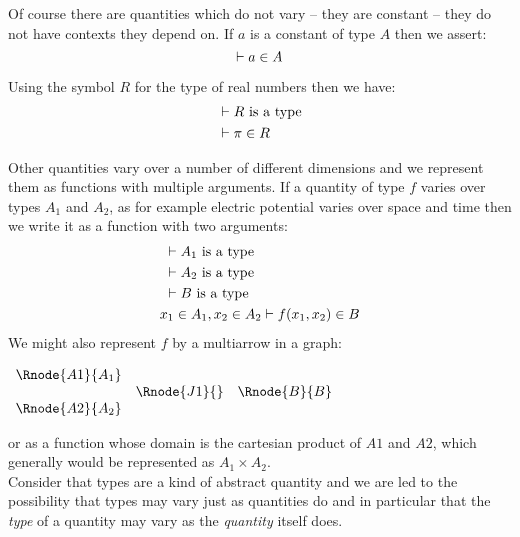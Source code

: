\documentclass[10pt,a4paper]{scrartcl}
\begin{document}
\noindent Of course there are quantities which do not vary  -- they are constant -- they do not have contexts they depend  on.  If $a$ is a constant of type $A$ then we assert: 
\begin{equation*}
\vdash a \in A
\end{equation*}

\noindent Using the symbol $R$ for the type of real numbers then we have:
\begin{align*}
&\vdash R\mbox{ is a type} \\
&\vdash \pi \in R
\end{align*}

\noindent Other quantities vary over a number of different dimensions and we represent them as functions
with multiple arguments. 
If a quantity of type $f$ varies over types $A_1$ and $A_2$, as for example electric potential varies over
space and time then we write it as a function with two arguments:
\begin{align*}
&\text{                                  }\vdash A_1\mbox{ is a type} \\
&\text{                                  }\vdash A_2\mbox{ is a type} \\
&\text{                                  }\vdash B\mbox{ is a type} \\
&x_1 \in A_1,x_2 \in A_2 \vdash f(x_1,x_2) \in B 
\end{align*}
\noindent
We might also represent $f$ by a multiarrow in a graph:
\setlength{\arraycolsep}{1cm}
\begin{center}
$
\begin{array}{cccc}
\Rnode{A1}{A_1}& & \\
                & \Rnode{J1}{}& \Rnode{B}{B} \\
\Rnode{A2}{A_2}& & \\
\end{array}
$

\end{center}
\setlength{\arraycolsep}{.2cm}
or as a function whose domain is the cartesian product of $A1$ and $A2$, which generally would be represented as $A_1 \times A_2$. \\

\noindent Consider that types are a kind of abstract quantity and we are led to the possibility that types
may vary just as quantities do and in particular that the \textit{type} of a quantity may vary as the \textit{quantity} itself  does.  \\
\end{document}
